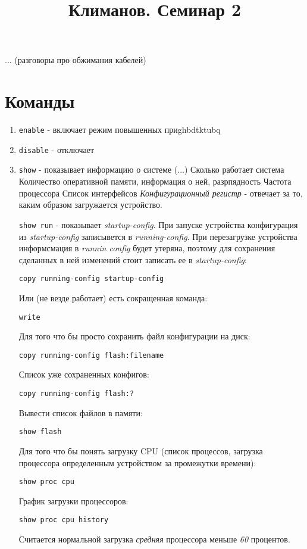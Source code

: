 \documentclass[a4paper,12pt]{article}
\title{Климанов. Семинар 2}
\begin{document}
	\maketitle
	... (разговоры про обжимания кабелей)
	\section{Команды}
	 \begin{enumerate}
	 	\item \texttt{enable} - включает режим повышенных приghbdtktubq
	 	\item \texttt{disable} - отключает
	 	\item \texttt{show} - показывает информацию о системе
	 	\subitem (...)
	 	\subitem Сколько работает система
	 	\subitem Количество оперативной памяти, информация о ней, разрпядность
	 	\subitem Частота процессора
	 	\subitem Список интерфейсов
	 	\subitem \emph{Конфигурационный регистр} - отвечает за то, каким образом загружается устройство.
	 	
	 	\texttt{show run} - показывает \emph{startup-config}. При запуске устройства конфигурация из \emph{startup-config} записывется в \emph{running-config}. При перезагрузке устройства информсмация в \emph{runnin config} будет утеряна, поэтому для сохранения сделанных в ней изменений стоит записать ее в \emph{startup-config}:
	 	
	 	\texttt{copy running-config startup-config}
	 	
	 	Или (не везде работает) есть сокращенная команда:
	 	
	 	\texttt{write}
	 	
	 	Для того что бы просто сохранить файл конфигурации на диск:
	 	
	 	\texttt{copy running-config flash:filename}
	 	
	 	Список уже сохраненных конфигов:
	 	
	 	\texttt{copy running-config flash:?}
	 	
	 	Вывести список файлов в памяти:
	 	
	 	\texttt{show flash}
	 	
	 	Для того что бы понять загрузку CPU (список процессов, загрузка процессора определенным устройством за промежутки времени):
	 	
	 	\texttt{show proc cpu}
	 	
	 	График загрузки процессоров:
	 	
	 	\texttt{show proc cpu history}
	 		
	 		Считается нормальной загрузка \emph{средняя} процессора меньше \emph{60} процентов.
	 \end{enumerate}
\end{document}
